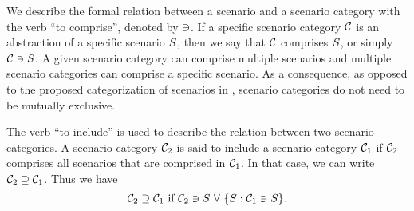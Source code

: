 We describe the formal relation between a scenario and a scenario category with the verb ``to comprise'', denoted by $\ni$. If a specific scenario category $\mathcal{C}$ is an abstraction of a specific scenario $S$, then we say that $\mathcal{C}$ comprises $S$, or simply $\mathcal{C} \ni S$. 
A given scenario category can comprise multiple scenarios and multiple scenario categories can comprise a specific scenario. %
\cstartd As a consequence, as opposed to the proposed categorization of scenarios in \autocite{opdencamp2014cats, USDoT2007precrashscenarios, lenard2014typical, lara2019harmonized}, scenario categories do not need to be mutually exclusive. \cendd

%	

The verb ``to include'' is used to describe the relation between two scenario categories. A scenario category $\mathcal{C}_{2}$ is said to include a scenario category $\mathcal{C}_{1}$ if $\mathcal{C}_{2}$ comprises all scenarios that are comprised in $\mathcal{C}_{1}$. In that case, we can write $\mathcal{C}_{2} \supseteq \mathcal{C}_{1}$. Thus we have
\begin{equation} \label{eq:scenario category include}
	\scenariocategoryb \includes \scenariocategorya \text{ if } \scenariocategoryb \comprises \scenario\,\,\forall\,\, \{S: \scenariocategorya \comprises \scenario\}.
\end{equation}

